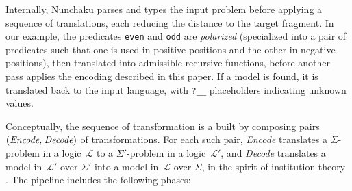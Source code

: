 
Internally, Nunchaku parses and types the input problem before applying a sequence
of translations, each reducing the distance to the target fragment.
In our example, the predicates
\verb!even! and \verb!odd! are \emph{polarized} (specialized into a pair of
predicates such that one is used in positive positions and the other in
negative positions),
then translated into admissible recursive functions,
before another pass applies the encoding described in this paper.
If a model is found, it is translated back to the input language,
with \verb$?__$ placeholders indicating unknown values.

Conceptually, the sequence of transformation is a 
built by composing pairs $(\textit{Encode},\vthinspace \textit{Decode})$ of
transformations. For each such pair, \textit{Encode} translates a
$\Sigma$-problem in a logic~$\mathcal{L}$ to a $\Sigma'$-problem
in a logic~$\mathcal{L}'$, and \textit{Decode} translates a model
in~$\mathcal{L}'$ over $\Sigma'$ into a model in~$\mathcal{L}$ over $\Sigma$,
in the spirit of institution theory \cite{goguen-burstall-1992}. The
pipeline includes the following phases:

